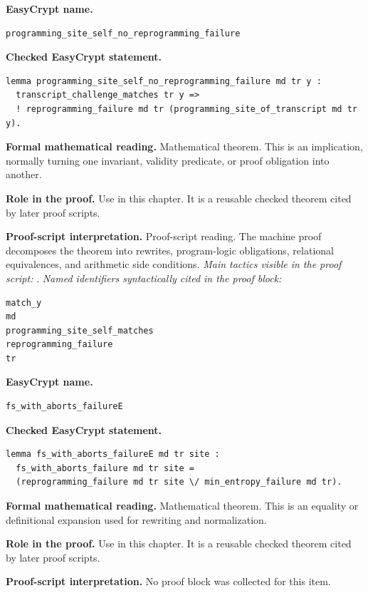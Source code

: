 \begin{formaltheorem}
\noindent\textbf{EasyCrypt name.}
\begin{lstlisting}[language=EasyCrypt,basicstyle=\ttfamily\scriptsize]
programming_site_self_no_reprogramming_failure
\end{lstlisting}
\noindent\textbf{Checked EasyCrypt statement.}
\begin{lstlisting}[language=EasyCrypt,basicstyle=\ttfamily\scriptsize]
lemma programming_site_self_no_reprogramming_failure md tr y :
  transcript_challenge_matches tr y =>
  ! reprogramming_failure md tr (programming_site_of_transcript md tr y).
\end{lstlisting}
\noindent\textbf{Formal mathematical reading.}
Mathematical theorem. This is an implication, normally turning one invariant, validity predicate, or proof obligation into another.

\noindent\textbf{Role in the proof.}
Use in this chapter. It is a reusable checked theorem cited by later proof scripts.

\noindent\textbf{Proof-script interpretation.}
Proof-script reading. The machine proof decomposes the theorem into rewrites, program-logic obligations, relational equivalences, and arithmetic side conditions.
\emph{Main tactics visible in the proof script:} .
\emph{Named identifiers syntactically cited in the proof block:}
\begin{lstlisting}[language=EasyCrypt,basicstyle=\ttfamily\scriptsize]
match_y
md
programming_site_self_matches
reprogramming_failure
tr
\end{lstlisting}

\end{formaltheorem}

\begin{formaltheorem}
\noindent\textbf{EasyCrypt name.}
\begin{lstlisting}[language=EasyCrypt,basicstyle=\ttfamily\scriptsize]
fs_with_aborts_failureE
\end{lstlisting}
\noindent\textbf{Checked EasyCrypt statement.}
\begin{lstlisting}[language=EasyCrypt,basicstyle=\ttfamily\scriptsize]
lemma fs_with_aborts_failureE md tr site :
  fs_with_aborts_failure md tr site =
  (reprogramming_failure md tr site \/ min_entropy_failure md tr).
\end{lstlisting}
\noindent\textbf{Formal mathematical reading.}
Mathematical theorem. This is an equality or definitional expansion used for rewriting and normalization.

\noindent\textbf{Role in the proof.}
Use in this chapter. It is a reusable checked theorem cited by later proof scripts.

\noindent\textbf{Proof-script interpretation.}
No proof block was collected for this item.

\end{formaltheorem}

